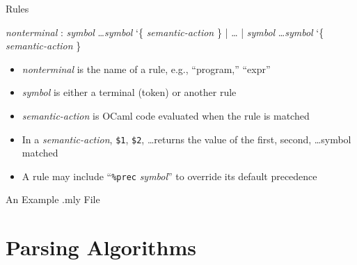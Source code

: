 \documentclass{plt}
\begin{document}
\begin{frame}[fragile]{Rules}

\begin{shadedverbatim}
\emph{nonterminal} :
    \emph{symbol} \ldots \emph{symbol} \char`\{ \emph{semantic-action} \}
  | \ldots
  | \emph{symbol} \ldots \emph{symbol} \char`\{ \emph{semantic-action} \}
\end{shadedverbatim}

\begin{itemize}
\item \emph{nonterminal} is the name of a rule, e.g., ``program,'' ``expr''
\item \emph{symbol} is either a terminal (token) or another rule
\item \emph{semantic-action} is OCaml code evaluated when the rule is
  matched
\item In a \emph{semantic-action}, \verb|$1|, \verb|$2|, \ldots returns
  the value of the first, second, \ldots symbol matched
\item A rule may include ``\verb|%prec| \emph{symbol}'' to override
                                its default precedence
\end{itemize}

\end{frame}

\begin{frame}[fragile]{An Example .mly File}


\end{frame}


\part{Parsing Algorithms}
\end{document}
